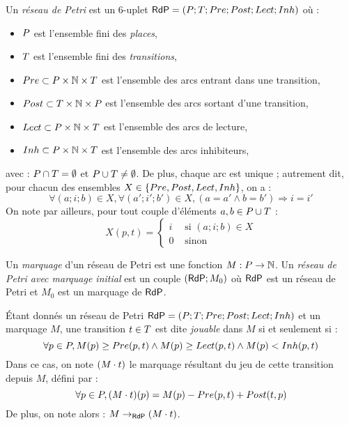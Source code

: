 \begin{definition}
  Un \emph{réseau de Petri} est un 6-uplet
  $\mathsf{RdP} = (P; T; Pre; Post; Lect; Inh)$ où :
  \begin{itemize}
    \item $P$ est l'ensemble fini des \emph{places},
    \item $T$ est l'ensemble fini des \emph{transitions},
    \item $Pre \subset P \times \mathbb{N} \times T$
      est l'ensemble des arcs entrant dans une transition,
    \item $Post \subset T \times \mathbb{N} \times P$
      est l'ensemble des arcs sortant d'une transition,
    \item $Lect \subset P \times \mathbb{N} \times T$ est l'ensemble des arcs de lecture,
    \item $Inh \subset P \times \mathbb{N} \times T$ est l'ensemble des arcs inhibiteurs,
  \end{itemize}
  avec : $P \cap T = \emptyset$ et $P \cup T \neq \emptyset$.
  De plus, chaque arc est unique ; autrement dit, pour chacun des ensembles
  $X \in \{ Pre, Post, Lect, Inh \}$, on a :
  \[\forall (a; i; b) \in X, \forall (a'; i'; b') \in X,
    (a = a' \wedge b = b') \Rightarrow i = i'\]
  On note par ailleurs, pour tout couple d'éléments $a, b \in P \cup T$ :
  \[X(p, t) = \begin{cases}
              i & \text{ si } (a; i; b) \in X \\
              0 & \text{ sinon}
            \end{cases}\]
%   
  
  Un \emph{marquage} d'un réseau de Petri est une fonction $M : P \rightarrow \mathbb{N}$.
  Un \emph{réseau de Petri avec marquage initial} est un couple $(\mathsf{RdP}; M_0)$
  où $\mathsf{RdP}$ est un réseau de Petri et $M_0$ est un marquage de $\mathsf{RdP}$.
%   
\end{definition}

\begin{definition}
  Étant donnés un réseau de Petri $\mathsf{RdP} = (P; T; Pre; Post; Lect; Inh)$
  et un marquage $M$,
  une transition $t \in T$ est dite \emph{jouable} dans $M$ si et seulement si :
  \[\forall p \in P, M(p) \geq Pre(p, t) \wedge M(p) \geq Lect(p, t)
    \wedge M(p) < Inh(p, t)\]
  Dans ce cas, on note $(M \cdot t)$ le marquage résultant du jeu de cette transition depuis $M$,
  défini par :
  \[\forall p \in P, (M \cdot t)(p) = M(p) - Pre(p, t) + Post(t, p)\]
  De plus, on note alors : $M \rightarrow_{\mathsf{RdP}} (M \cdot t)$.
\end{definition}

